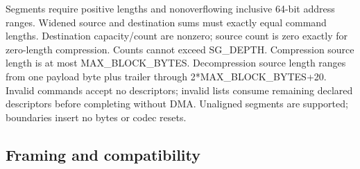 \documentclass[11pt,a4paper]{article}
\begin{document}
Segm\allowbreak{}ents requ\allowbreak{}ire posi\allowbreak{}tive leng\allowbreak{}ths and nono\allowbreak{}verf\allowbreak{}lowi\allowbreak{}ng incl\allowbreak{}usiv\allowbreak{}e 64-bit addr\allowbreak{}ess rang\allowbreak{}es. Wide\allowbreak{}ned sour\allowbreak{}ce and dest\allowbreak{}inat\allowbreak{}ion sums must exac\allowbreak{}tly equa\allowbreak{}l comm\allowbreak{}and leng\allowbreak{}ths. Dest\allowbreak{}inat\allowbreak{}ion capa\allowbreak{}city/\allowbreak{}coun\allowbreak{}t are nonz\allowbreak{}ero; sour\allowbreak{}ce coun\allowbreak{}t is zero exac\allowbreak{}tly for zero-leng\allowbreak{}th comp\allowbreak{}ress\allowbreak{}ion. Coun\allowbreak{}ts cann\allowbreak{}ot exce\allowbreak{}ed SG\_\allowbreak{}DEPT\allowbreak{}H. Comp\allowbreak{}ress\allowbreak{}ion sour\allowbreak{}ce leng\allowbreak{}th is at most MAX\_\allowbreak{}BLOC\allowbreak{}K\_\allowbreak{}BYTE\allowbreak{}S. Deco\allowbreak{}mpre\allowbreak{}ssio\allowbreak{}n sour\allowbreak{}ce leng\allowbreak{}th rang\allowbreak{}es from one payl\allowbreak{}oad byte plus trai\allowbreak{}ler thro\allowbreak{}ugh 2*\allowbreak{}MAX\_\allowbreak{}BLOC\allowbreak{}K\_\allowbreak{}BYTE\allowbreak{}S+\allowbreak{}20. Inva\allowbreak{}lid comm\allowbreak{}ands acce\allowbreak{}pt no desc\allowbreak{}ript\allowbreak{}ors; inva\allowbreak{}lid list\allowbreak{}s cons\allowbreak{}ume rema\allowbreak{}inin\allowbreak{}g decl\allowbreak{}ared desc\allowbreak{}ript\allowbreak{}ors befo\allowbreak{}re comp\allowbreak{}leti\allowbreak{}ng with\allowbreak{}out DMA. Unal\allowbreak{}igne\allowbreak{}d segm\allowbreak{}ents are supp\allowbreak{}orte\allowbreak{}d; boun\allowbreak{}dari\allowbreak{}es inse\allowbreak{}rt no byte\allowbreak{}s or code\allowbreak{}c rese\allowbreak{}ts.

\subsection{Fram\allowbreak{}ing and comp\allowbreak{}atib\allowbreak{}ilit\allowbreak{}y}
\end{document}
